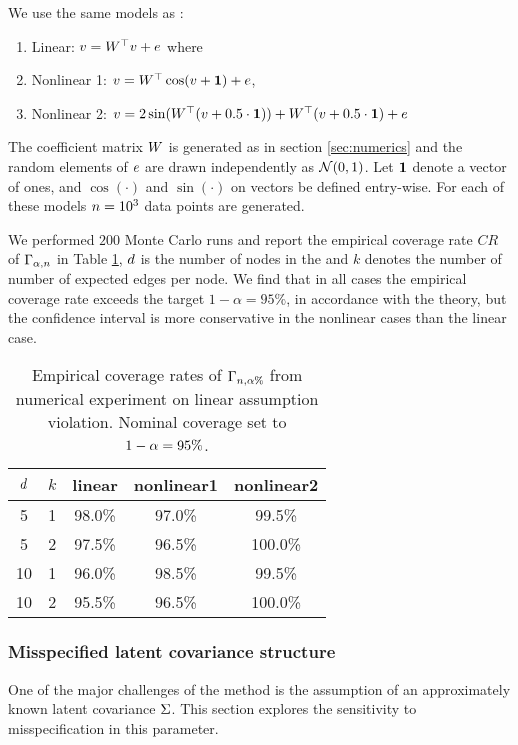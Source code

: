 We use the same models as \citet{yu_daggnn_2019}:
\begin{enumerate}
    \item Linear: $v=W^\top v+e$ where 
    \item Nonlinear 1: $v=W^\top \cos(v+\mathbf{1}) +e$,
    \item Nonlinear 2: $v=2\sin (W^\top(v+0.5\cdot \mathbf{1})) + W^\top(v+0.5\cdot \mathbf{1}) +e$
\end{enumerate}
The coefficient matrix $W$ is generated as in section \ref{sec:numerics} and the random elements of $e$ are drawn independently as $\mathcal N (0,1)$. Let $\mathbf{1}$ denote a vector of ones, and $\cos(\cdot)$ and $\sin(\cdot)$ on vectors be defined entry-wise.
For each of these models $n=10^{3}$ data points are generated. %

We performed $200$ Monte Carlo runs and report the empirical coverage rate $CR$  of $\Gamma_{\alpha, n}$ in Table \ref{tab:nonlinear_results}, $d$ is the number of nodes in the \scm{} and $k$ denotes the number of number of expected edges per node. We find that in all cases the empirical coverage rate exceeds the target $1-\alpha = 95\%$, in accordance with the theory, but the confidence interval is more conservative in the nonlinear cases than the linear case. 

\begin{table}
    \centering
    \caption{Empirical coverage rates of $\Gamma_{n,\alpha\%}$ from numerical experiment on linear assumption violation. Nominal coverage set to $1-\alpha=95\%$.}\label{tab:nonlinear_results}
    \begin{tabular}{ccccc}
      \toprule
      $d$ & $k$ & linear&nonlinear1&nonlinear2\\
      \midrule
      5 & 1 & 98.0\% & 97.0\%& 99.5\% \\
      5 & 2 & 97.5\% & 96.5\%& 100.0\% \\
      10 & 1 & 96.0\% & 98.5\%& 99.5\% \\
      10 & 2 & 95.5\% & 96.5\%& 100.0\% \\
      \bottomrule
    \end{tabular}
\end{table}


\subsubsection{Misspecified latent covariance structure}
One of the major challenges of the method is the assumption of an approximately known latent covariance $\Sigma$. This section explores the sensitivity to misspecification in this parameter.


